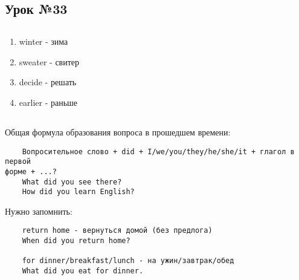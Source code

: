 \subsection{Урок №33}

\subsection*{}
\begin{multicols}{2}
    \begin{enumerate}\setlength{\itemsep}{0pt}
        \item winter - зима
        \item sweater - свитер
        \item decide - решать
        \item earlier - раньше
    \end{enumerate}
\end{multicols}

\subsection*{}
Общая формула образования вопроса в прошедшем времени:
\begin{verbatim}
    Вопросительное слово + did + I/we/you/they/he/she/it + глагол в первой
форме + ...?
    What did you see there?
    How did you learn English?
\end{verbatim}

Нужно запомнить:
\begin{verbatim}
    return home - вернуться домой (без предлога)
    When did you return home?

    for dinner/breakfast/lunch - на ужин/завтрак/обед
    What did you eat for dinner.
\end{verbatim}